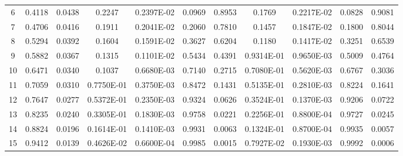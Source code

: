 \documentclass[
twocolumn,
aps,prd,
nofootinbib,
superscriptaddress,
showpacs,ligh
tightenlines, 
]{revtex4}
\begin{document}
\begin{widetext}
\begin{table}[h]
\begin{center}
\begin{tabular}{|c|c|c|c|c|c|c|c|c|c|c|}
      6                 &        0.4118             &        0.0438             &     0.2247                 &     0.2397E-02             &        0.0969             &        0.8953             & 0.1769 & 0.2217E-02 & 0.0828 & 0.9081 \\
      7                 &        0.4706             &        0.0416             &     0.1911                 &     0.2041E-02             &        0.2060             &        0.7810             & 0.1457 & 0.1847E-02 & 0.1800 & 0.8044 \\
      8                 &        0.5294             &        0.0392             &     0.1604                 &     0.1591E-02             &        0.3627             &        0.6204             & 0.1180 & 0.1417E-02 & 0.3251 & 0.6539 \\
      9                 &        0.5882             &        0.0367             &     0.1315                 &     0.1101E-02             &        0.5434             &        0.4391             & 0.9314E-01 & 0.9650E-03 & 0.5009 & 0.4764 \\
      10                 &        0.6471             &        0.0340             &     0.1037                 &     0.6680E-03             &        0.7140             &        0.2715             & 0.7080E-01 & 0.5620E-03 & 0.6767 & 0.3036 \\
      11                 &        0.7059             &        0.0310             &     0.7750E-01             &     0.3750E-03             &        0.8472             &        0.1431             & 0.5135E-01 & 0.2810E-03 & 0.8224 & 0.1641 \\
      12                 &        0.7647             &        0.0277             &     0.5372E-01             &     0.2350E-03             &        0.9324             &        0.0626             & 0.3524E-01 & 0.1370E-03 & 0.9206 & 0.0722 \\
      13                 &        0.8235             &        0.0240             &     0.3305E-01             &     0.1830E-03             &        0.9758             &        0.0221             & 0.2256E-01 & 0.8800E-04 & 0.9727 & 0.0245 \\
      14                 &        0.8824             &        0.0196             &     0.1614E-01             &     0.1410E-03             &        0.9931             &        0.0063             & 0.1324E-01 & 0.8700E-04 & 0.9935 & 0.0057 \\
      15                &        0.9412             &        0.0139             &     0.4626E-02             &     0.6600E-04             &        0.9985             &        0.0015             & 0.7927E-02 & 0.1930E-03 & 0.9992 & 0.0006 \\
     



\end{tabular}
\end{center}
\end{table}
\end{widetext}
\end{document}
